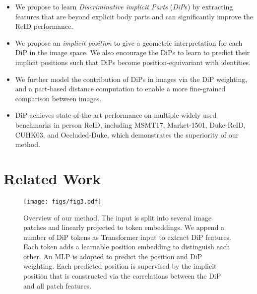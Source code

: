 \documentclass[10pt,twocolumn,letterpaper]{article}
\begin{document}
\vspace{-0.2cm}
\begin{itemize}
\setlength{\itemsep}{2pt}
\setlength{\parsep}{2pt}
\setlength{\parskip}{2pt}
\item We propose to learn \textit{Discriminative implicit Parts} (\textit{DiP}s) by extracting features that are beyond explicit body parts and can significantly improve the ReID performance.

\item We propose an \textit{implicit position} to give a geometric interpretation for each DiP in the image space. We also encourage the DiPs to learn to predict their implicit positions such that DiPs become position-equivariant with identities.

\item We further model the contribution of DiPs in images via the DiP weighting, and a part-based distance computation to enable a more fine-grained comparison between images.

\item DiP achieves state-of-the-art performance on multiple widely used benchmarks in person ReID, including  MSMT17\cite{wei2018person}, Market-1501\cite{zheng2015scalable}, Duke-ReID\cite{ristani2016performance}, CUHK03\cite{li2014deepreid}, and Occluded-Duke\cite{miao2019pose}, which demonstrates the superiority of our method.
\end{itemize}


\section{Related Work}
\label{sec:related}

\begin{figure*}
\setlength{\abovecaptionskip}{-0.2cm}
\begin{center}
    \texttt{[image: figs/fig3.pdf]}
\end{center}
   \caption{Overview of our method. The input is split into several image patches and linearly projected to token embeddings. We append a number of DiP tokens as Transformer input to extract DiP features. Each token adds a learnable position embedding to distinguish each other. An MLP is adopted to predict the position and DiP weighting. Each predicted position is supervised by the implicit position that is constructed via the correlations between the DiP and all patch features.}
\label{fig:overview}
\end{figure*}
\end{document}
